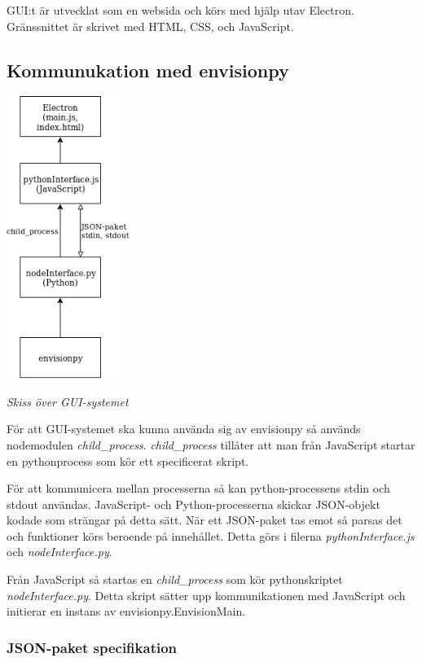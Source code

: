 \documentclass[10pt,oneside,swedish]{article}
\begin{document}
GUI:t är utvecklat som en websida och körs med hjälp utav Electron.
Gränssnittet är skrivet med HTML, CSS, och JavaScript.

\subsection{Kommunukation med
envisionpy}\label{kommunukation-med-envisionpy}

\includegraphics[width=0.30000\textwidth]{Images/gui-system-structure.png}

\emph{Skiss över GUI-systemet}

För att GUI-systemet ska kunna använda sig av envisionpy så används
nodemodulen \emph{child\_process}. \emph{child\_process} tillåter att
man från JavaScript startar en pythonprocess som kör ett specificerat
skript.

För att kommunicera mellan processerna så kan python-processens stdin
och stdout användas. JavaScript- och Python-processerna skickar
JSON-objekt kodade som strängar på detta sätt. När ett JSON-paket tas
emot så parsas det och funktioner körs beroende på innehållet. Detta görs i filerna \emph{pythonInterface.js} och
\emph{nodeInterface.py}.

Från JavaScript så startas en \emph{child\_process} som kör
pythonskriptet \emph{nodeInterface.py}. Detta skript sätter upp
kommunikationen med JavaScript och initierar en instans av
envisionpy.EnvisionMain.

\subsubsection{JSON-paket specifikation}\label{json-paket-specifikation}
\end{document}
